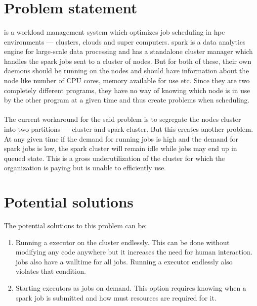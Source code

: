 
\section{Problem statement}

\paragraph{}
 is a workload management system which optimizes \gls{job}
scheduling in \gls{hpc} environments --- clusters, clouds and super computers.
\gls{spark} is a data analytics engine for large-scale data processing and has a
standalone cluster manager which handles the spark jobs sent to a cluster of
nodes. But for both of these, their own daemons should be running on the nodes
and should have information about the node like number of CPU cores, memory
available for use etc. Since they are two completely different programs, they
have no way of knowing which node is in use by the other program at a given time
and thus create problems when scheduling.

\paragraph{}
The current workaround for the said problem is to segregate the nodes cluster
into two partitions ---  cluster and \gls{spark} cluster. But
this creates another problem. At any given time if the demand for running
 jobs is high and the demand for \gls{spark} jobs is low, the
\gls{spark} cluster will remain idle while  jobs may end up in
queued state. This is a gross underutilization of the cluster for which the
organization is paying but is unable to efficiently use.


\section{Potential solutions}

The potential solutions to this problem can be:
\begin{enumerate}
    \item Running a \gls{executor} on the  cluster
        endlessly. This can be done without modifying any code anywhere but it
        increases the need for human interaction.  jobs also
        have a \gls{walltime} for all jobs. Running a \gls{executor}
        endlessly also violates that condition.
    \item Starting \glspl{executor} as  jobs on demand.
        This option requires knowing when a \gls{spark} job is submitted and how
        must resources are required for it.
\end{enumerate}


